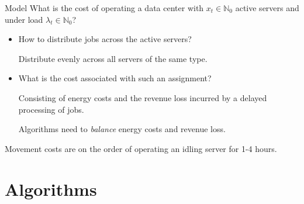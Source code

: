\documentclass{beamer}
\def\spadding{\vspace{0.25cm}}
\begin{document}
\begin{frame}{Model}
What is the cost of operating a data center with $x_t \in \mathbb{N}_0$ active servers and under load $\lambda_t \in \mathbb{N}_0$?\pause
\begin{itemize}
    \item How to distribute jobs across the active servers?\pause\par
        Distribute evenly across all servers of the same type.\pause
    \item What is the cost associated with such an assignment?\pause\par
        Consisting of energy costs and the revenue loss incurred by a delayed processing of jobs.\pause\par
        Algorithms need to \emph{balance} energy costs and revenue loss.
\end{itemize}\pause\spadding

Movement costs are on the order of operating an idling server for 1-4 hours.
\end{frame}

\section{Algorithms}

\end{document}
